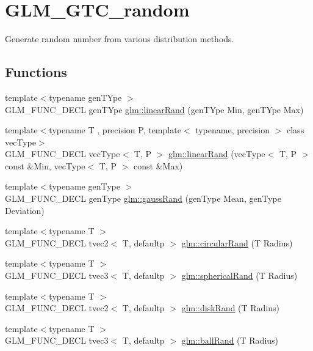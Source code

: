 \hypertarget{group__gtc__random}{}\section{G\+L\+M\+\_\+\+G\+T\+C\+\_\+random}
\label{group__gtc__random}


Generate random number from various distribution methods.  


\subsection*{Functions}
\begin{DoxyCompactItemize}
\item 
{\footnotesize template$<$typename gen\+T\+Ype $>$ }\\G\+L\+M\+\_\+\+F\+U\+N\+C\+\_\+\+D\+E\+C\+L gen\+T\+Ype \hyperlink{group__gtc__random_ga12aebc19b85a8c736f5801c2f7b9b716}{glm\+::linear\+Rand} (gen\+T\+Ype Min, gen\+T\+Ype Max)
\item 
{\footnotesize template$<$typename T , precision P, template$<$ typename, precision $>$ class vec\+Type$>$ }\\G\+L\+M\+\_\+\+F\+U\+N\+C\+\_\+\+D\+E\+C\+L vec\+Type$<$ T, P $>$ \hyperlink{group__gtc__random_gaba9cec867916d894d794a32897b7fdfd}{glm\+::linear\+Rand} (vec\+Type$<$ T, P $>$ const \&Min, vec\+Type$<$ T, P $>$ const \&Max)
\item 
{\footnotesize template$<$typename gen\+Type $>$ }\\G\+L\+M\+\_\+\+F\+U\+N\+C\+\_\+\+D\+E\+C\+L gen\+Type \hyperlink{group__gtc__random_ga5193a83e49e4fdc5652c084711083574}{glm\+::gauss\+Rand} (gen\+Type Mean, gen\+Type Deviation)
\item 
{\footnotesize template$<$typename T $>$ }\\G\+L\+M\+\_\+\+F\+U\+N\+C\+\_\+\+D\+E\+C\+L tvec2$<$ T, defaultp $>$ \hyperlink{group__gtc__random_gae989c26a2899b2fb7444abe7c275c29c}{glm\+::circular\+Rand} (T Radius)
\item 
{\footnotesize template$<$typename T $>$ }\\G\+L\+M\+\_\+\+F\+U\+N\+C\+\_\+\+D\+E\+C\+L tvec3$<$ T, defaultp $>$ \hyperlink{group__gtc__random_gaa9a6fc2d7a295b3857f7db23b1053d9d}{glm\+::spherical\+Rand} (T Radius)
\item 
{\footnotesize template$<$typename T $>$ }\\G\+L\+M\+\_\+\+F\+U\+N\+C\+\_\+\+D\+E\+C\+L tvec2$<$ T, defaultp $>$ \hyperlink{group__gtc__random_gad3a3ee7d26502a31ba552cb627a68606}{glm\+::disk\+Rand} (T Radius)
\item 
{\footnotesize template$<$typename T $>$ }\\G\+L\+M\+\_\+\+F\+U\+N\+C\+\_\+\+D\+E\+C\+L tvec3$<$ T, defaultp $>$ \hyperlink{group__gtc__random_ga5506dee301160e3a06aef9b9bc7a0a83}{glm\+::ball\+Rand} (T Radius)
\end{DoxyCompactItemize}


